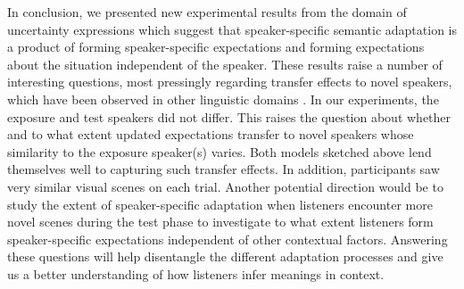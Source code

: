 In conclusion, we presented new experimental results from the domain of uncertainty expressions which suggest that speaker-specific semantic adaptation
is a product of forming speaker-specific expectations and forming expectations about the situation independent of the
speaker.
These results raise a number of interesting questions, most pressingly regarding transfer effects to novel speakers, which 
have been observed in other linguistic domains . In our experiments, the exposure and test speakers
did not differ. This raises the question about whether and to what extent updated expectations transfer to novel speakers whose similarity to the exposure speaker(s) varies.
Both models sketched above lend themselves well to capturing such transfer effects.
In addition, participants saw very similar visual scenes on each trial. Another potential direction would be to study the 
extent of speaker-specific adaptation when listeners encounter more novel scenes during the test phase to investigate to what extent
listeners form speaker-specific expectations independent of other contextual factors.
Answering these
questions will help disentangle the different adaptation processes and give us a better understanding
of how listeners infer meanings in context.

